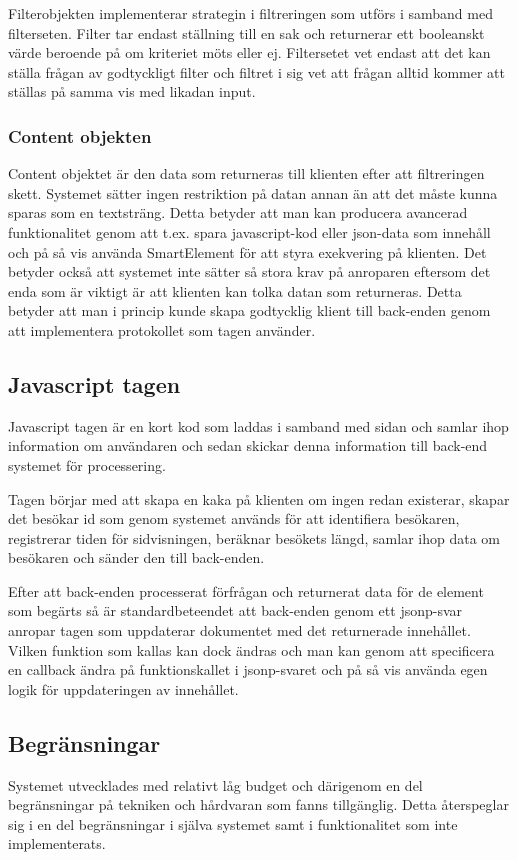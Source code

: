 Filterobjekten implementerar strategin i filtreringen som utförs i samband med filterseten. Filter tar endast ställning till en sak och returnerar ett booleanskt värde beroende på om kriteriet möts eller ej. Filtersetet vet endast att det kan ställa frågan av godtyckligt filter och filtret i sig vet att frågan alltid kommer att ställas på samma vis med likadan input.

\subsubsection{Content objekten}



Content objektet är den data som returneras till klienten efter att filtreringen skett. Systemet sätter ingen restriktion på datan annan än att det måste kunna sparas som en textsträng. Detta betyder att man kan producera avancerad funktionalitet genom att t.ex. spara javascript-kod eller \gls{json}-data som innehåll och på så vis använda SmartElement för att styra exekvering på klienten. Det betyder också att systemet inte sätter så stora krav på anroparen eftersom det enda som är viktigt är att klienten kan tolka datan som returneras. Detta betyder att man i princip kunde skapa godtycklig klient till back-enden genom att implementera protokollet som tagen använder.

\subsection{Javascript tagen}

Javascript tagen är en kort kod som laddas i samband med sidan och samlar ihop information om användaren och sedan skickar denna information till back-end systemet för processering.

Tagen börjar med att skapa en kaka på klienten om ingen redan existerar, skapar det besökar id som genom systemet används för att identifiera besökaren, registrerar tiden för sidvisningen, beräknar besökets längd, samlar ihop data om besökaren och sänder den till back-enden.

Efter att back-enden processerat förfrågan och returnerat data för de element som begärts så är standardbeteendet att back-enden genom ett \gls{jsonp}-svar anropar tagen som uppdaterar dokumentet med det returnerade innehållet. Vilken funktion som kallas kan dock ändras och man kan genom att specificera en callback ändra på funktionskallet i \gls{jsonp}-svaret och på så vis använda egen logik för uppdateringen av innehållet.

\subsection{Begränsningar}

Systemet utvecklades med relativt låg budget och därigenom en del begränsningar på tekniken och hårdvaran som fanns tillgänglig. Detta återspeglar sig i en del begränsningar i själva systemet samt i funktionalitet som inte implementerats.


